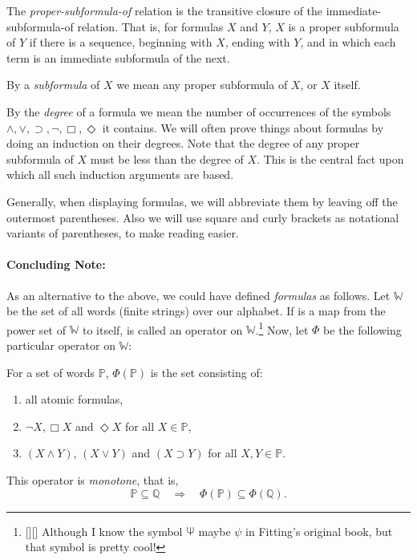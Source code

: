 The \textit{proper-subformula-of} relation is the transitive closure of the immediate-subformula-of relation.
% 
That is,
for formulas $X$ and $Y$, 
$X$ is a proper subformula of $Y$ if there is a sequence, 
beginning with $X$, ending with $Y$, 
and in which each term is an immediate subformula of the next.


By a \textit{subformula} of $X$ we mean any proper subformula of $X$, or $X$ itself.


By the \textit{degree} of a formula we mean the number of occurrences of the symbols $\land,\lor,\supset,\neg,\Box,\Diamond$ it contains.
% 
We will often prove things about formulas by doing an induction on their degrees. 
% 
Note that the degree of any proper subformula of $X$ must be less than the degree of $X$.
% 
This is the central fact upon which all such induction arguments are based.



Generally, 
when displaying formulas, 
we will abbreviate them by leaving off the outermost parentheses.
% 
Also we will use square and curly brackets as notational variants of parentheses, 
to make reading easier.



\paragraph{Concluding Note:}

As an alternative to the above, 
we could have defined \textit{formulas} as follows.
% 
Let $\mathbb{W}$ be the set of all words (finite strings) over our alphabet. 
% 
% 
If  is a map from the power set of $\mathbb{W}$ to itself, 
 is called an operator on $\mathbb{W}$.\footnote{
    [][] Although I know the symbol $\rotatebox[origin=c]{180}{$\pitchfork$}$ maybe $\psi$ in Fitting's original book, 
    but that symbol is pretty cool!
}
% 
Now, 
let $\Phi$ be the following particular operator on $\mathbb{W}$:

For a set of words $\mathbb{P}$,
$\Phi(\mathbb{P})$ is the set consisting of:
\begin{enumerate}[itemsep=5pt,parsep=5pt,leftmargin=3em,topsep=5pt,label=(\arabic*)] %
    \item all atomic formulas,

    \item $\neg X,\Box X$ and $\Diamond X$ for all $X \in \mathbb{P}$, 

    \item $(X \land Y)$, $(X \lor Y)$ and $(X \supset Y)$ for all $X,Y \in \mathbb{P}$.
\end{enumerate}
This operator is \textit{monotone}, 
that is,
\[
    \mathbb{P} \subseteq \mathbb{Q} 
    \quad\Longrightarrow\quad
    \Phi(\mathbb{P}) \subseteq \Phi(\mathbb{Q}).
\]


